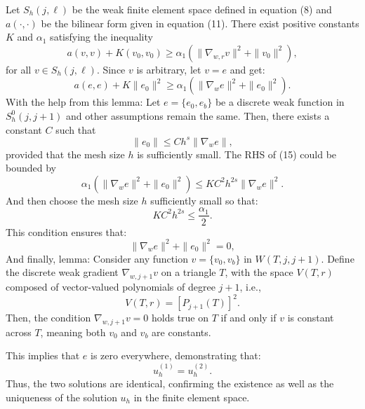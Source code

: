 \documentclass[12pt]{article} %
\begin{document}
Let \( S_h(j, \ell) \) be the weak finite element space defined in equation (8) and \( a(\cdot, \cdot) \) be the bilinear form given in equation (11). There exist positive constants \( K \) and \( \alpha_1 \) satisfying the inequality
\begin{equation}
    a(v, v) + K(v_0, v_0) \geq \alpha_1(\|\nabla_{w,r}v\|^2 + \|v_0\|^2),
\end{equation}
for all \( v \in S_h(j, \ell) \). Since $v$ is arbitrary, let $v = e$ and get:
\begin{equation}
    a(e, e) + K \|e_0\|^2 \geq \alpha_1 (\|\nabla_w e\|^2 + \|e_0\|^2).
\end{equation}
With the help from this lemma:
Let \( e = \{e_0, e_b\} \) be a discrete weak function in \( S^0_h(j, j+1) \) and other assumptions remain the same. Then, there exists a constant \( C \) such that
\begin{equation}
    \|e_0\| \leq C h^s \|\nabla_w e\|,
\end{equation}
provided that the mesh size \( h \) is sufficiently small.
The RHS of (15) could be bounded by 
\begin{equation}
    \alpha_1 (\|\nabla_w e\|^2 + \|e_0\|^2) \leq K C^2 h^{2s} \|\nabla_w e\|^2.
\end{equation}
And then choose the mesh size \( h \) sufficiently small so that:
\begin{equation}
    K C^2 h^{2s} \leq \frac{\alpha_1}{2}.
\end{equation}
This condition ensures that:
\begin{equation}
    \|\nabla_w e\|^2 + \|e_0\|^2 = 0,
\end{equation}
And finally, lemma: Consider any function \( v = \{v_0, v_b\} \) in \( W(T, j, j+1) \). Define the discrete weak gradient \( \nabla_{w,j+1}v \) on a triangle \( T \), with the space \( V(T, r) \) composed of vector-valued polynomials of degree \( j+1 \), i.e., 
\begin{equation}
    V(T, r) = [P_{j+1}(T)]^2.
\end{equation}
Then, the condition \( \nabla_{w,j+1}v = 0 \) holds true on \( T \) if and only if \( v \) is constant across \( T \), meaning both \( v_0 \) and \( v_b \) are constants.

This implies that \( e \) is zero everywhere, demonstrating that:
\begin{equation}
    u^{(1)}_h = u^{(2)}_h.
\end{equation}
Thus, the two solutions are identical, confirming the existence as well as the uniqueness of the solution $u_h$ in the finite element space.
\end{document}
